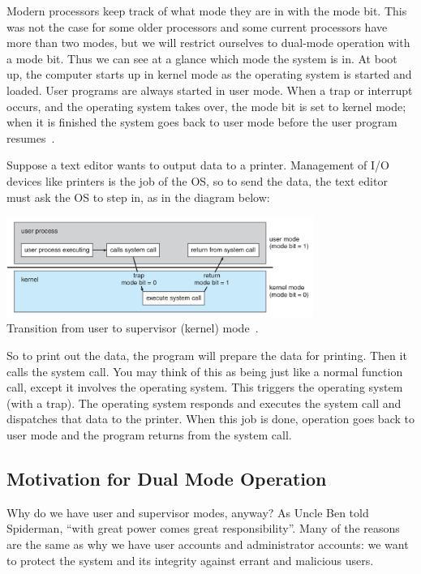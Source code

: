 Modern processors keep track of what mode they are in with the mode bit. This was not the case for some older processors and some current processors have more than two modes, but we will restrict ourselves to dual-mode operation with a mode bit. Thus we can see at a glance which mode the system is in. At boot up, the computer starts up in kernel mode as the operating system is started and loaded. User programs are always started in user mode. When a trap or interrupt occurs, and the operating system takes over, the mode bit is set to kernel mode; when it is finished the system goes back to user mode before the user program resumes~\cite{osc}.

Suppose a text editor wants to output data to a printer. Management of I/O devices like printers is the job of the OS, so to send the data, the text editor must ask the OS to step in, as in the diagram below:

\begin{center}
	\includegraphics[width=0.75\textwidth]{images/trap.png}\\
	Transition from user to supervisor (kernel) mode~\cite{osc}.
\end{center}


So to print out the data, the program will prepare the data for printing. Then it calls the system call. You may think of this as being just like a normal function call, except it involves the operating system. This triggers the operating system (with a trap). The operating system responds and executes the system call and dispatches that data to the printer. When this job is done, operation goes back to user mode and the program returns from the system call.

\subsection*{Motivation for Dual Mode Operation}

Why do we have user and supervisor modes, anyway? As Uncle Ben told Spiderman, ``with great power comes great responsibility''. Many of the reasons are the same as why we have user accounts and administrator accounts: we want to protect the system and its integrity against errant and malicious users.

